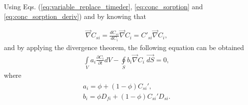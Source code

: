 \documentclass[a4paper,14pt,english]{extreport}
\begin{document}
 Using Eqs. (\ref{eq:variable_replace_timeder}, \ref{eq:conc_sorption} and \ref{eq:conc_sorption_deriv}) and by knowing that
 
  \begin{eqnarray}
 \label{eq:variable_replace}
\vec\nabla C_{si} =  \frac{dC_{si}}{dC_{i}}\vec\nabla C_{i} = C'_{si}\vec\nabla C_{i},
 \end{eqnarray}
and by applying the divergence theorem, the following equation can be obtained
  \begin{eqnarray}
 \label{eq:diffusuin_multicomp_integral}
 \int \limits_{V} a_{i} \frac{\partial C_{i}}{\partial t} d V - \oint \limits_{S} b_{i} \vec{\nabla}C_{i} \; \vec{dS} = 0,
 \end{eqnarray}
where  
 \begin{eqnarray}
 \begin{gathered}
 \label{eq:alpha}
 a_{i}  =  \phi + \left(1-\phi \right)C_{si}', \\ 
 b_{i}  = \phi D_{fi} + \left(1-\phi \right) C_{si}'D_{si}.
 \end{gathered}
 \end{eqnarray}

 
\end{document}
